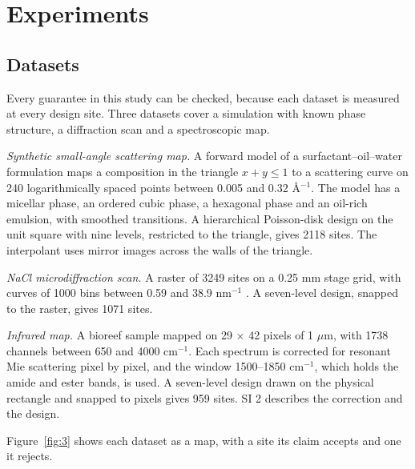 \documentclass{iopjournal}
\begin{document}
\hypertarget{sec:4}{%
\section{Experiments}\label{sec:4}}

\hypertarget{sec:4-1}{%
\subsection{Datasets}\label{sec:4-1}}

Every guarantee in this study can be checked, because each dataset is measured at every design site. Three datasets cover a simulation with known phase structure, a diffraction scan and a spectroscopic map.

\emph{Synthetic small-angle scattering map.} A forward model of a surfactant--oil--water formulation maps a composition in the triangle \(x + y \le 1\) to a scattering curve on 240 logarithmically spaced points between 0.005 and 0.32 \AA{}\ensuremath{^{-1}}. The model has a micellar phase, an ordered cubic phase, a hexagonal phase and an oil-rich emulsion, with smoothed transitions. A hierarchical Poisson-disk design on the unit square with nine levels, restricted to the triangle, gives 2118 sites. The interpolant uses mirror images across the walls of the triangle.

\emph{NaCl microdiffraction scan.} A raster of 3249 sites on a 0.25 mm stage grid, with curves of 1000 bins between 0.59 and 38.9 nm\ensuremath{^{-1}} \cite{ALSNaCl}. A seven-level design, snapped to the raster, gives 1071 sites.

\emph{Infrared map.} A bioreef sample mapped on 29 \ensuremath{\times} 42 pixels of 1 \ensuremath{\mu}m, with 1738 channels between 650 and 4000 cm\ensuremath{^{-1}}. Each spectrum is corrected for resonant Mie scattering pixel by pixel, and the window 1500--1850 cm\ensuremath{^{-1}}, which holds the amide and ester bands, is used. A seven-level design drawn on the physical rectangle and snapped to pixels gives 959 sites. SI 2 describes the correction and the design.

Figure~\ref{fig:3} shows each dataset as a map, with a site its claim accepts and one it rejects.
\end{document}
